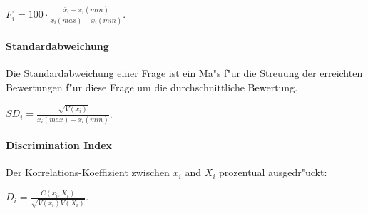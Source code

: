\documentclass[12pt]{report}
\begin{document}
$F_i = 100\cdot\frac{\bar{x}_i - x_i(min)}{x_i(max) - x_i(min)}$. 

\paragraph{Standardabweichung}
Die Standardabweichung einer Frage ist ein Ma"s f"ur die Streuung der erreichten Bewertungen f"ur diese Frage um die durchschnittliche Bewertung. 

$SD_i = \frac{\sqrt{V(x_i)}}{x_i(max) - x_i(min)}$.

\paragraph{Discrimination Index}
Der Korrelations-Koeffizient zwischen $x_i$ and $X_i$ prozentual ausgedr"uckt:

$D_i= \frac{C(x_i, X_i)}{\sqrt{V(x_i)V(X_i)}}$.

\ \\
\end{document}
